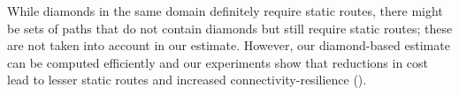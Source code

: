 While diamonds in the same domain definitely require 
static routes, there might be
sets of paths that do not contain 
diamonds but still require static routes;
these are not
taken into account in our estimate. 
However, our diamond-based estimate
can be computed efficiently and 
our experiments show that reductions 
in cost lead to lesser static routes
and increased connectivity-resilience ().


